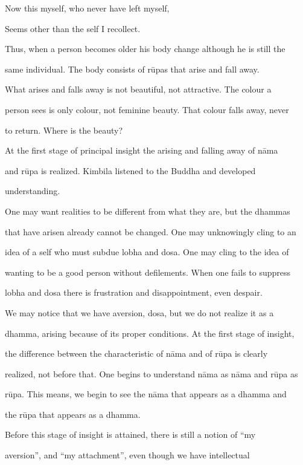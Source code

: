       Now this myself, who never have left myself, 

      Seems other than the self I recollect. 



Thus, when  a person becomes  older his body  change  although he  is  still the  

same individual. The body consists of rūpas that arise and fall away. 

   What  arises  and  falls  away   is  not  beautiful,  not  attractive.  The  colour  a  

person sees is only colour, not feminine beauty. That colour falls away, never  

to return. Where is the beauty? 

   At the first  stage  of principal  insight the  arising  and falling  away  of nāma  

and   rūpa   is   realized.   Kimbila   listened   to   the   Buddha   and   developed  

understanding. 



One may want realities to be different from what they are, but the dhammas  

that have arisen already cannot be changed. One may unknowingly cling to an  

idea of a self who must subdue lobha and dosa. One may cling to the idea of  

wanting to be a good person without defilements. When one fails to suppress  

lobha and dosa there is frustration and disappointment, even despair. 

   We may  notice that we have  aversion,  dosa, but we  do  not realize  it  as  a  

dhamma, arising because of its proper conditions. At the first stage of insight,  

the   difference   between   the   characteristic   of   nāma   and   of   rūpa   is   clearly  

realized, not before that. One begins to understand nāma as nāma and rūpa as  

rūpa. This means, we begin to  see the nāma that  appears  as  a  dhamma  and  

the rūpa that appears as a dhamma. 

   Before   this   stage   of   insight   is   attained,   there   is   still   a   notion   of   “my  

aversion”,   and   “my   attachment”,   even   though   we   have   intellectual  

